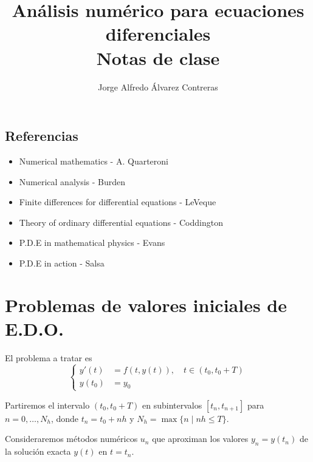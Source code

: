 \documentclass[11pt,letterpaper]{report}
\title{Análisis numérico para ecuaciones diferenciales
  \\ \vspace{5mm}
\large Notas de clase}
\author{Jorge Alfredo Álvarez Contreras}
\begin{document}
\maketitle
\tableofcontents

\section*{Referencias}

\begin{itemize}
  \item
    Numerical mathematics - A. Quarteroni
  \item
    Numerical analysis - Burden
  \item
    Finite differences for differential equations - LeVeque
  \item
    Theory of ordinary differential equations - Coddington
  \item
    P.D.E in mathematical physics - Evans
  \item
    P.D.E in action - Salsa
\end{itemize}

\chapter{Problemas de valores iniciales de E.D.O.}

El problema a tratar es
\begin{equation}
  \left\{
    \begin{aligned}
      y'(t) &= f(t,y(t)), \quad t \in (t_0,t_0+T)
      \\
      y(t_0) &= y_0
    \end{aligned}
  \right.
\end{equation}

Partiremos el intervalo $(t_0,t_0+T)$ en subintervalos
$[t_n,t_{n+1}]$ para $n=0,\dots,N_h$, donde $t_n=t_0+nh$ y
$N_h=\max\{n\mid nh\leq T\}$.

Consideraremos métodos numéricos $u_n$ que aproximan los valores
$y_n=y(t_n)$ de la solución exacta $y(t)$ en $t=t_n$.
\end{document}
